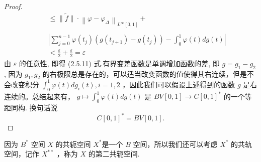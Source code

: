\documentclass[lang=cn,newtx,10pt,scheme=chinese,thmcnt=chapter]{elegantbook}
\begin{document}
\begin{proof}
\begin{equation*}
\begin{aligned}
& \quad \leqslant\|\widetilde{f}\| \cdot\left\|\varphi-\varphi_{\Delta}\right\|_{L^{\infty}[0,1]}+ \\
& \\
& \quad\left|\sum_{j=0}^{n-1} \varphi\left(t_j\right)\left(g\left(t_{j+1}\right)-g\left(t_j\right)\right)-\int_0^1 \varphi(t) d g(t)\right| \\
& \quad<\frac{\varepsilon}{2}+\frac{\varepsilon}{2}=\varepsilon
\end{aligned}
\end{equation*}
由 $\varepsilon$ 的任意性, 即得 (2.5.11) 式.有界变差函数是单调增加函数的差, 即 $g=g_1-g_2$, 因为 $g_1, g_2$ 的右极限总是存在的，可以适当改变函数的值使得其右连续，但是不会改变积分 $\int_0^1 \varphi(t) d g_i(t), i=1,2$ ，因此我们可以假设上述得到的函数 $g$ 是右连续的。总结起来有， $g \mapsto \int_0^1 \varphi(t) d g(t)$ 是 $B V[0,1] \rightarrow C[0,1]^*$ 的一个等距同构. 换句话说
\begin{equation*}
C[0,1]^*=B V[0,1] .
\end{equation*}
\end{proof}
\begin{definition}
 因为 $B^*$ 空间 $X$ 的共轭空间 $X ^*$是一个 $B$ 空间，所以我们还可以考虑 $X ^*$ 的共轨空间，记作 $X ^{* *}$ ，称为 $X$ 的第二共轭空间. 
\end{definition}
\end{document}
